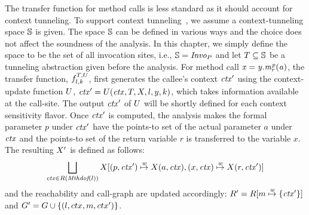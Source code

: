 The transfer function for method calls is less standard as it should 
account for context tunneling. 
To support context tunneling~\cite{JeJeOh18}, we assume a context-tunneling space $\mathbb{S}$ is given. 
The space $\mathbb{S}$ can be defined in various ways and the choice does not affect the soundness of the analysis. 
In this chapter, we simply define the space to be the set of all invocation sites, i.e., $\mathbb{S} = \text{\it Invo}_P$ and let $T \subseteq \mathbb{S}$ be a tunneling abstraction given before the analysis. 
For method call ${\it x =
y.m^p_r(a)}$, 
the transfer function, $f^{T, U}_{l, k}$,  first generates the callee's context ${\it ctx}'$ using the context-update function $U$, ${\it ctx}' = U({\it ctx}, T, X, l, y, k)$, which takes information available at the
call-site. 
The output ${\it ctx}'$ of $U$ will be shortly defined for each context sensitivity flavor.
Once ${\it ctx}'$ is computed, the analysis makes the formal
parameter $p$ under ${\it ctx}'$ have the points-to set of the actual
parameter $a$ under ${\it ctx}$ and the points-to set of the return variable
$r$ is transferred to the variable
$x$. The resulting $X'$ is
defined as follows: 
\[
 \bigsqcup_{{\it ctx} \in R(\text{\it Mthdof}(l))}
  	X[	(p,{\it ctx}')
	\stackrel {{\it w}}{\mapsto} X(a, {\it ctx}), 
	(x, {\it ctx}) \stackrel {{\it w}}{\mapsto} X(r,
	{\it ctx}')]
\]
     and the reachability and call-graph are updated accordingly:
      $R' = R[ m \stackrel {{\it w}}{\mapsto} \{ {\it ctx}' \}]$ and $G' = G \cup\{(l,ctx,m,ctx')\}$.




